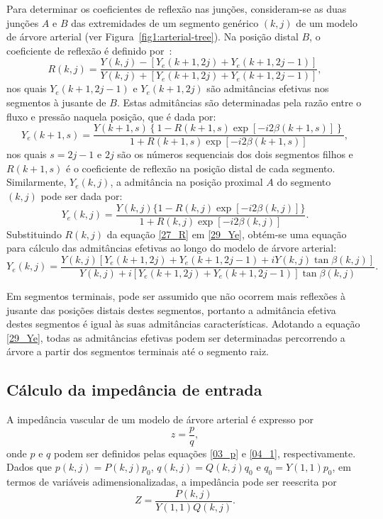 \documentclass[a4paper,12pt]{monografia}
\theoremstyle{plain}
\theoremstyle{definition}
\theoremstyle{remark}
\begin{document}
Para determinar os coeficientes de reflexão nas junções, consideram-se as duas junções $A$ e $B$ das extremidades de um segmento genérico $(k,j)$ de um modelo de árvore arterial (ver Figura~\ref{fig1:arterial-tree}). Na posição distal $B$, o coeficiente de reflexão é definido por~\cite{Fung,Lighthill}:
\begin{equation}
	R(k,j) = \frac{Y(k,j) - [Y_e(k+1,2j) + Y_e(k+1,2j-1)]}{Y(k,j) + [Y_e(k+1,2j) + Y_e(k+1,2j-1)]},
	\label{27_R}
\end{equation}
nos quais $Y_e(k+1,2j-1)$ e $Y_e(k+1,2j)$ são admitâncias efetivas nos segmentos à jusante de $B$. Estas admitâncias são determinadas pela razão entre o fluxo e pressão naquela posição, que é dada por:
\begin{equation}
	Y_e(k+1,s) = \frac{Y(k+1,s)\left\{1 - R(k+1,s)\exp{[-i2\beta(k+1,s)]}\right\}}{1 + R(k+1,s)\exp{[-i2\beta(k+1,s)]}},
	\label{28_Ye}
\end{equation}
nos quais $s = 2j-1$ e $2j$ são os números sequenciais dos dois segmentos filhos e $R(k+1,s)$ é o coeficiente de reflexão na posição distal de cada segmento. Similarmente, $Y_e(k,j)$, a admitância na posição proximal $A$ do segmento $(k,j)$ pode ser dada por:
\begin{equation}
	Y_e(k,j) = \frac{Y(k,j)\{1 - R(k,j)\exp{[-i2\beta(k,j)]}\} }{1 + R(k,j)\exp{[-i2\beta(k,j)]}}
	\label{29_Ye}.
\end{equation}
Substituindo $R(k,j)$ da equação \eqref{27_R} em \eqref{29_Ye}, obtém-se  uma equação para cálculo das admitâncias efetivas ao longo do modelo de árvore arterial:
\begin{equation}
	Y_e(k,j) = \frac{Y(k,j) [Y_e(k+1,2j) + Y_e(k+1,2j-1)+ i Y(k,j)\tan{\beta(k,j)}]}{Y(k,j) + i[Y_e(k+1,2j) + Y_e(k+1,2j-1)]\tan{\beta(k,j)}}.
	\label{30_Ye}
\end{equation}

Em segmentos terminais, pode ser assumido que não ocorrem mais reflexões à jusante das posições distais destes segmentos, portanto a admitância efetiva destes segmentos é igual às suas admitâncias características. Adotando a equação \eqref{29_Ye}, todas as admitâncias efetivas podem ser determinadas percorrendo a árvore a partir dos segmentos terminais até o segmento raiz.

\subsection{Cálculo da impedância de entrada}

A impedância vascular de um modelo de árvore arterial é expresso por
\begin{equation}
	z = \frac{p}{q},
\end{equation}
onde $p$ e $q$ podem ser definidos pelas equações \eqref{03_p} e \eqref{04_1}, respectivamente. Dados que $p(k,j) = P(k,j) p_0$, $q(k,j) = Q(k,j) q_0$ e $q_0 = Y(1,1) p_0$, em termos de variáveis adimensionalizadas, a impedância pode ser reescrita por
\begin{equation}
	Z = \frac{P(k,j)}{Y(1,1) Q(k,j)}.
\end{equation}
\end{document}
